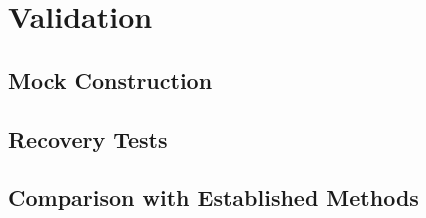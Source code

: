 \section{Validation}
\label{sec:validation}

\subsection{Mock Construction}
\label{subsec:mocks}


\subsection{Recovery Tests}
\label{subsec:recovery}


\subsection{Comparison with Established Methods}
\label{subsec:comparison}

